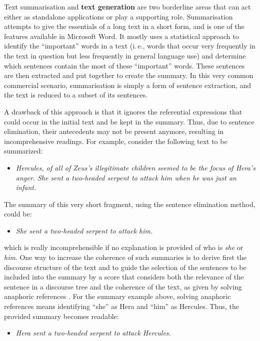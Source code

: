 \documentclass[]{../../metanetpaper}
\begin{document}
\begin{multicols}{2}
Text summarisation and \textbf{text generation} are two borderline areas that can act either as standalone applications or play a supporting role. Summarisation attempts to give the essentials of a long text in a short form, and is one of the features available in Microsoft Word. It mostly uses a statistical approach to identify the “important” words in a text (i.\,e., words that occur very frequently in the text in question but less frequently in general language use) and determine which sentences contain the most of these “important” words. These sentences are then extracted and put together to create the summary. In this very common commercial scenario, summarisation is simply a form of sentence extraction, and the text is reduced to a subset of its sentences. 

A drawback of this approach is that it ignores the referential expressions that could occur in the initial text and be kept in the summary. Thus, due to sentence elimination, their antecedents may not be present anymore, resulting in incomprehensive readings. For example, consider the following text to be summarized:

\begin{itemize}
\item\textit{Hercules, of all of Zeus’s illegitimate children seemed to be the focus of Hera’s anger. She sent a two-headed serpent to attack him when he was just an infant.}
\end{itemize}

The summary of this very short fragment, using the sentence elimination method, could be:

\begin{itemize}
\item \textit{She sent a two-headed serpent to attack him.}
\end{itemize}

\noindent
which is really incomprehensible if no explanation is provided of who is \textit{she} or \textit{him}.
One way to increase the coherence of such summaries is to derive first the discourse structure of the text and to guide the selection of the sentences to be included into the summary by a score that considers both the relevance of the sentence in a discourse tree and the coherence of the text, as given by solving anaphoric references \cite{cristea1}. For the summary example above, solving anaphoric references means identifying “she” as Hera and “him” as Hercules. Thus, the provided summary becomes readable:

\begin{itemize}
\item \textit{Hera sent a two-headed serpent to attack Hercules.}
\end{itemize}


\end{multicols}
\end{document}
